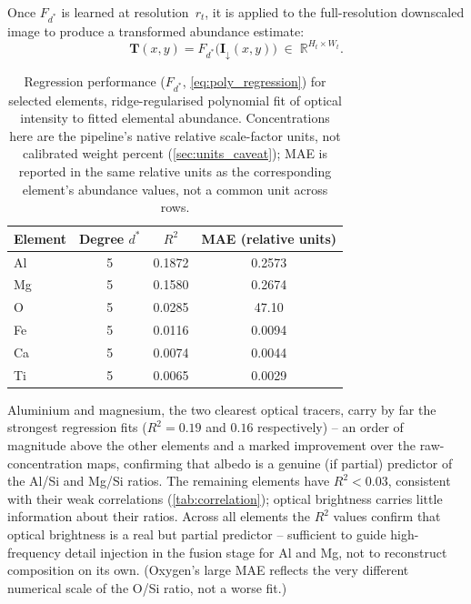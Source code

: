 \documentclass[journal,lettersize]{IEEEtran}
\begin{document}
Once $F_{d^*}$ is learned at resolution~$r_t$, it is applied to the
full-resolution downscaled image to produce a transformed abundance
estimate:
\begin{equation}\label{eq:transform}
  \mathbf{T}(x,y) = F_{d^*}\!\bigl(\mathbf{I}_\downarrow(x,y)\bigr)
  \;\in\; \mathbb{R}^{H_t \times W_t}.
\end{equation}

\begin{table}[!t]
  \centering
  \caption{Regression performance ($F_{d^*}$, \cref{eq:poly_regression})
    for selected elements, ridge-regularised polynomial fit of
    optical intensity to fitted elemental abundance.  Concentrations here
    are the pipeline's native relative scale-factor units, not
    calibrated weight percent (\cref{sec:units_caveat}); MAE is reported
    in the same relative units as the corresponding element's abundance
    values, not a common unit across rows.}
  \label{tab:regression}
  \begin{tabular}{lccc}
    \toprule
    \textbf{Element} & \textbf{Degree $d^*$} & $R^2$ & \textbf{MAE (relative units)} \\
    \midrule
    Al   & 5 & 0.1872 & 0.2573 \\
    Mg   & 5 & 0.1580 & 0.2674 \\
    O    & 5 & 0.0285 & 47.10 \\
    Fe   & 5 & 0.0116 & 0.0094 \\
    Ca   & 5 & 0.0074 & 0.0044 \\
    Ti   & 5 & 0.0065 & 0.0029 \\
    \bottomrule
  \end{tabular}
\end{table}

Aluminium and magnesium, the two clearest optical tracers, carry by far
the strongest regression fits ($R^2 = 0.19$ and $0.16$ respectively) --
an order of magnitude above the other elements and a marked improvement
over the raw-concentration maps, confirming that albedo is a genuine
(if partial) predictor of the Al/Si and Mg/Si ratios. The remaining
elements have $R^2 < 0.03$, consistent with their weak correlations
(\cref{tab:correlation}); optical brightness carries little information
about their ratios. Across all elements the $R^2$ values confirm that
optical brightness is a real but partial predictor -- sufficient to guide
high-frequency detail injection in the fusion stage for Al and Mg, not to
reconstruct composition on its own. (Oxygen's large MAE reflects the very
different numerical scale of the O/Si ratio, not a worse fit.)
\end{document}
